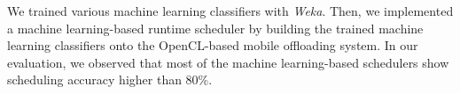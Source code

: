 \documentclass[10pt, conference, compsocconf]{IEEEtran}
\begin{document}
%
%
We trained various machine learning classifiers with
\textit{Weka}.
%
Then, we implemented a machine learning-based runtime scheduler by
building the trained machine learning classifiers onto the
OpenCL-based mobile offloading system.
%
%
In our evaluation, we observed that most of the machine learning-based
schedulers show scheduling accuracy higher than 80\%.
%
%
%
%
%
%
%
\end{document}
